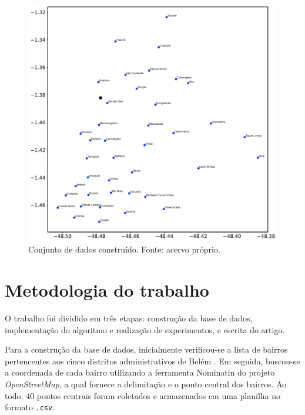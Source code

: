 \documentclass[12pt]{article}
\begin{document}
\begin{figure}[h!]
    \includegraphics[width=\linewidth]{figures/base_de_dados}
    \caption{Conjunto de dados construído. Fonte: acervo próprio.}
    \label{fig:base_de_dados}
\end{figure} 



\section{Metodologia do trabalho} %
\label{sec:metodologia}           %



O trabalho foi dividido em três etapas: construção da base de dados, implementação do algoritmo e realização de experimentos, e escrita do artigo.

Para a construção da base de dados, inicialmente verificou-se a lista de bairros pertencentes aos cinco distritos administrativos de Belém \cite{belemwiki}. Em seguida, buscou-se a coordenada de cada bairro utilizando a ferramenta Nominatin do projeto \textit{OpenStreetMap}, a qual fornece a delimitação e o ponto central dos bairros. Ao todo, 40 pontos centrais foram coletados e armazenados em uma planilha no formato \texttt{.csv}.
\end{document}
